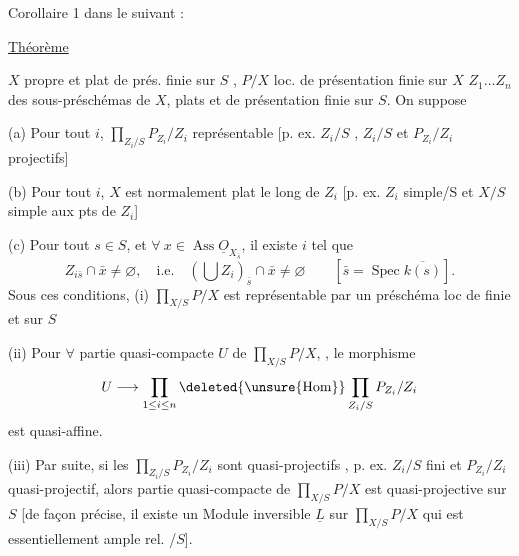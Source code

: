 Corollaire 1   dans le suivant :

\uline{Théorème}

$X$ propre et plat de prés. finie sur $S$ ,
$P/X$ loc. de présentation finie sur $X$
$Z_1\ldots Z_n$ des sous-préschémas  de $X$, plats et de présentation finie
sur $S$. On suppose

(a) Pour tout $i$, $\displaystyle\prod_{Z_i/S}P_{Z_i}/Z_i$ représentable
[p. ex. $Z_i/S$ , 
$Z_i/S$ et $P_{Z_i}/Z_i$ projectifs]

(b) Pour tout $i$, $X$ est normalement plat le long de $Z_i$
[p. ex. $Z_i$ simple/S et $X/S$ simple aux pts de $Z_i$]

(c) Pour tout $s\in S$, et $\forall\ x\in\operatorname{Ass}\underline{O}_{X_{\bar s}}$, il existe $i$ tel que
\[
Z_{i\bar s}\cap\bar x\ne\varnothing,\quad\text{i.e.}\quad
(\bigcup Z_i)_{\bar s}\cap\bar x\ne\varnothing\qquad[\bar s=\operatorname{Spec}\overline{k(s)}].
\]
Sous ces conditions, (i) $\displaystyle\prod_{X/S}P/X$ est représentable
par un préschéma loc de   finie et  sur $S$

 (ii) Pour $\forall$ partie  quasi-compacte $U$ de
$\displaystyle\prod_{X/S}P/X$, ,
le morphisme
\[
U\longrightarrow\prod_{1\leq i\leq n}\deleted{\unsure{\operatorname{Hom}}}\prod_{Z_i/S}P_{Z_i}/Z_i
\]
est quasi-affine.

(iii) Par suite, si les
$\displaystyle\prod_{Z_i/S}P_{Z_i}/Z_i$ sont quasi-projectifs  ,
p. ex. $Z_i/S$ fini et $P_{Z_i}/Z_i$
quasi-projectif, alors  partie quasi-compacte de
$\displaystyle\prod_{X/S}P/X$ est quasi-projective sur $S$ [de façon précise, il
existe un Module inversible $\underline L$ sur $\displaystyle\prod_{X/S}P/X$ qui est
essentiellement ample rel. /$S$].

